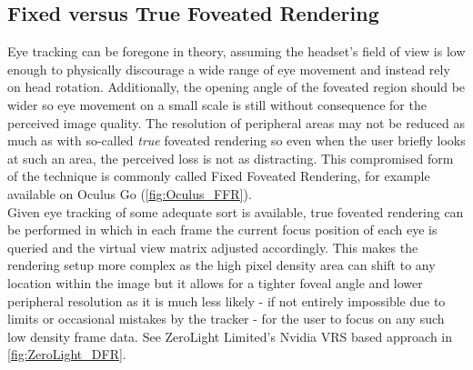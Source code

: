\subsection{Fixed versus True Foveated Rendering}
Eye tracking can be foregone in theory, assuming the headset's field of view is low enough to physically discourage a wide range of eye movement and instead rely on head rotation. Additionally, the opening angle of the foveated region should be wider so eye movement on a small scale is still without consequence for the perceived image quality. The resolution of peripheral areas may not be reduced as much as with so-called \textit{true} foveated rendering so even when the user briefly looks at such an area, the perceived loss is not as distracting. This compromised form of the technique is commonly called Fixed Foveated Rendering, for example available on Oculus Go (\autoref{fig:Oculus_FFR}). \\
Given eye tracking of some adequate sort is available, true foveated rendering can be performed in which in each frame the current focus position of each eye is queried and the virtual view matrix adjusted accordingly. This makes the rendering setup more complex as the high pixel density area can shift to any location within the image but it allows for a tighter foveal angle and lower peripheral resolution as it is much less likely - if not entirely impossible due to limits or occasional mistakes by the tracker - for the user to focus on any such low density frame data. See ZeroLight Limited's \gls{Nvidia VRS} based approach in \autoref{fig:ZeroLight_DFR}. 

